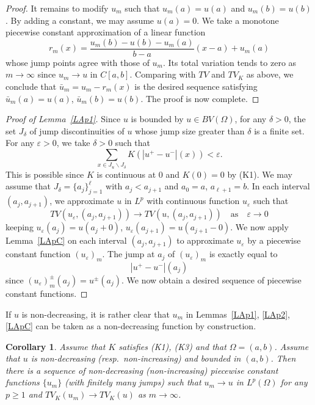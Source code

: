 \documentclass[12pt, reqno]{amsart}
\numberwithin{equation}{section}
\newtheorem{cor}[thm]{Corollary}
\begin{document}
\begin{proof}
It remains to modify $u_m$ such that $u_m(a)=u(a)$ and $u_m(b)=u(b)$.
 By adding a constant, we may assume $u(a)=0$.
 We take a monotone piecewise constant approximation of a linear function
\[
	r_m(x) = \frac{u_m(b) -u(b)-u_m(a)}{b-a} (x-a)
	+ u_m(a)
\]
whose jump points agree with those of $u_m$.
 Its total variation tends to zero as $m\to\infty$ since $u_m\to u$ in $C[a,b]$.
 Comparing with $TV$ and $TV_K$ as above, we conclude that $\bar{u}_m=u_m-r_m(x)$ is the desired sequence satisfying $\bar{u}_m(a)=u(a)$, $\bar{u}_m(b)=u(b)$.
 The proof is now complete. 
\end{proof}
%
\begin{proof}[Proof of Lemma~\ref{LAp1}]

Since $u$ is bounded by $u\in BV(\Omega)$, for any $\delta>0$, the set $J_\delta$ of jump discontinuities of $u$ whose jump size greater than $\delta$ is a finite set.
 For any $\varepsilon>0$, we take $\delta>0$ such that
\[
	\sum_{x\in J_u\backslash J_\delta} K\left(|u^+-u^-|(x)\right) < \varepsilon.
\]
This is possible since $K$ is continuous at $0$ and $K(0)=0$ by (K1).
 We may assume that $J_\delta=\{a_j\}_{j=1}^\ell$ with $a_j<a_{j+1}$ and $a_0=a$, $a_{\ell+1}=b$.
 In each interval $(a_j,a_{j+1})$, we approximate $u$ in $L^p$ with continuous function $u_\varepsilon$ such that
 \[
    TV\left( u_\varepsilon,(a_j,a_{j+1}) \right)
    \to TV\left( u,(a_j,a_{j+1}) \right)
    \quad\text{as}\quad \varepsilon \to 0
 \]
keeping $u_\varepsilon(a_j)=u(a_j+0)$, $u_\varepsilon(a_{j+1})=u(a_{j+1}-0)$.
 We now apply Lemma~\ref{LApC} on each interval $(a_j,a_{j+1})$ to approximate $u_\varepsilon$ by a piecewise constant function $(u_\varepsilon)_m$.
 The jump at $a_j$ of $(u_\varepsilon)_m$ is exactly equal to
\[
	|u^+ - u^-| (a_j)
\]
since $(u_\varepsilon)_m^\pm (a_j)= u^\pm(a_j)$.
 We now obtain a desired sequence of piecewise constant functions.
\end{proof}
%
If $u$ is non-decreasing, it is rather clear that $u_m$ in Lemmas~\ref{LAp1}, \ref{LAp2}, \ref{LApC} can be taken as a non-decreasing function by construction.
\begin{cor} \label{CApMon}
Assume that $K$ satisfies (K1), (K3) and that $\Omega=(a,b)$.
 Assume that $u$ is non-decreasing (resp.\ non-increasing) and bounded in $(a,b)$.
 Then there is a sequence of non-decreasing (non-increasing) piecewise constant functions $\{u_m\}$ (with finitely many jumps) such that $u_m\to u$ in $L^p(\Omega)$ for any $p\ge1$ and $TV_K(u_m)\to TV_K(u)$ as $m\to\infty$.
\end{cor}
\end{document}
